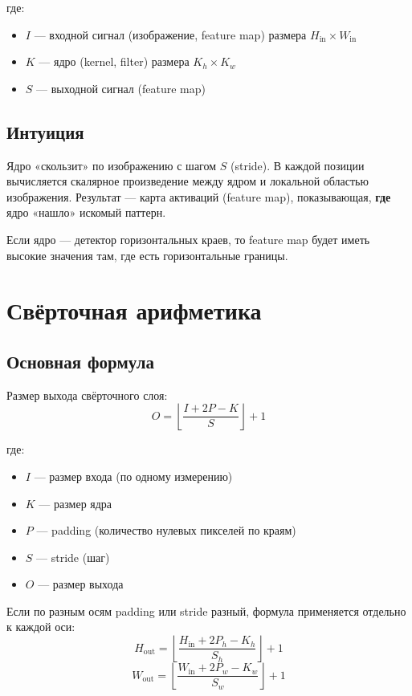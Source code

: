 \documentclass[a4paper,12pt]{article}
\begin{document}
где:
\begin{itemize}
    \item $I$ — входной сигнал (изображение, feature map) размера $H_{\text{in}} \times W_{\text{in}}$
    \item $K$ — ядро (kernel, filter) размера $K_h \times K_w$
    \item $S$ — выходной сигнал (feature map)
\end{itemize}

\subsection{Интуиция}

Ядро «скользит» по изображению с шагом $S$ (stride). В каждой позиции вычисляется скалярное произведение между ядром и локальной областью изображения. Результат — карта активаций (feature map), показывающая, \textbf{где} ядро «нашло» искомый паттерн.

Если ядро — детектор горизонтальных краев, то feature map будет иметь высокие значения там, где есть горизонтальные границы.

\section{Свёрточная арифметика}

\subsection{Основная формула}

Размер выхода свёрточного слоя:
\[
O = \left\lfloor \frac{I + 2P - K}{S} \right\rfloor + 1
\]

где:
\begin{itemize}
    \item $I$ — размер входа (по одному измерению)
    \item $K$ — размер ядра
    \item $P$ — padding (количество нулевых пикселей по краям)
    \item $S$ — stride (шаг)
    \item $O$ — размер выхода
\end{itemize}

Если по разным осям padding или stride разный, формула применяется отдельно к каждой оси:
\[
H_{\text{out}} = \left\lfloor \frac{H_{\text{in}} + 2P_h - K_h}{S_h} \right\rfloor + 1
\]
\[
W_{\text{out}} = \left\lfloor \frac{W_{\text{in}} + 2P_w - K_w}{S_w} \right\rfloor + 1
\]
\end{document}
